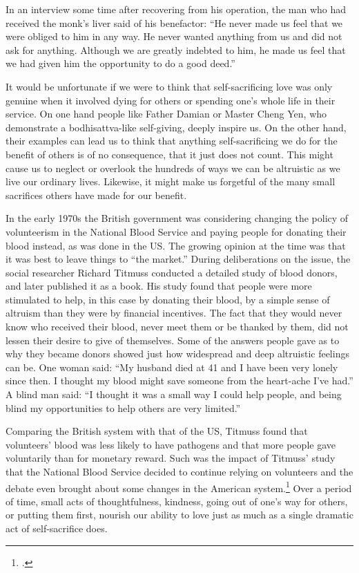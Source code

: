 \documentclass[10pt, openright]{book}
\begin{document}
In an interview some time after recovering from his operation, the man who had received the monk’s liver said of his benefactor: “He never made us feel that we were obliged to him in any way. He never wanted anything from us and did not ask for anything. Although we are greatly indebted to him, he made us feel that we had given him the opportunity to do a good deed.”


It would be unfortunate if we were to think that self-sacrificing love was only genuine when it involved dying for others or spending one’s whole life in their service. On one hand people like Father Damian or Master Cheng Yen, who demonstrate a bodhisattva-like self-giving, deeply inspire us. On the other hand, their examples can lead us to think that anything self-sacrificing we do for the benefit of others is of no consequence, that it just does not count. This might cause us to neglect or overlook the hundreds of ways we can be altruistic as we live our ordinary lives. Likewise, it might make us forgetful of the many small sacrifices others have made for our benefit.


In the early 1970s the British government was considering changing the policy of volunteerism in the National Blood Service and paying people for donating their blood instead, as was done in the US. The growing opinion at the time was that it was best to leave things to “the market.” During deliberations on the issue, the social researcher Richard Titmuss conducted a detailed study of blood donors, and later published it as a book. His study found that people were more stimulated to help, in this case by donating their blood, by a simple sense of altruism than they were by financial incentives. The fact that they would never know who received their blood, never meet them or be thanked by them, did not lessen their desire to give of themselves. Some of the answers people gave as to why they became donors showed just how widespread and deep altruistic feelings can be. One woman said: “My husband died at 41 and I have been very lonely since then. I thought my blood might save someone from the heart-ache I’ve had.” A blind man said: “I thought it was a small way I could help people, and being blind my opportunities to help others are very limited.”


Comparing the British system with that of the US, Titmuss found that volunteers’ blood was less likely to have pathogens and that more people gave voluntarily than for monetary reward. Such was the impact of Titmuss’ study that the National Blood Service decided to continue relying on volunteers and the debate even brought about some changes in the American system.\footnote {\cite{Titmuss 1970}.} Over a period of time, small acts of thoughtfulness, kindness, going out of one’s way for others, or putting them first, nourish our ability to love just as much as a single dramatic act of self-sacrifice does.
\end{document}
